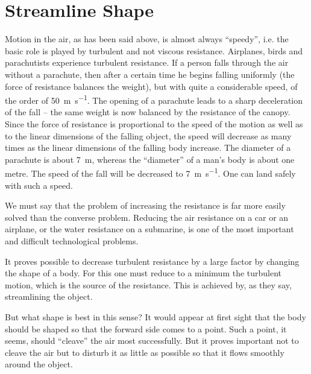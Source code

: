 \section{Streamline Shape}

Motion in the air, as has been said above, is almost always ``speedy'', i.e. the basic role is played by turbulent and not viscous resistance. Airplanes, birds and parachut­ists experience turbulent resistance. If a person falls through the air without a parachute, then after a certain time he begins falling uniformly (the force of resistance balances the weight), but with quite a considerable speed, of the order of \SI{50}{\meter\per\second}. The opening of a parachute leads to a sharp deceleration of the fall -- the same weight is now balanced by the resistance of the canopy. Since the force of resistance is proportional to the speed of the mo­tion as well as to the linear dimensions of the falling object, the speed will decrease as many times as the linear dimensions of the falling body increase. The diameter of a parachute is about \SI{7}{\meter}, whereas the ``diameter'' of a man’s body is about one metre. The speed of the fall will be decreased to \SI{7}{\meter\per\second}. One can land safely with such a speed.

We must say that the problem of increasing the re­sistance is far more easily solved than the converse prob­lem. Reducing the air resistance on a car or an airplane, or the water resistance on a submarine, is one of the most important and difficult technological problems.

It proves possible to decrease turbulent resistance by a large factor by changing the shape of a body. For this one must reduce to a minimum the turbulent motion, which is the source of the resistance. This is achieved by, as they say, streamlining the object.

But what shape is best in this sense? It would appear at first sight that the body should be shaped so that the forward side comes to a point. Such a point, it seems, should ``cleave'' the air most successfully. But it proves important not to cleave the air but to disturb it as little as possible so that it flows smoothly around the object.


